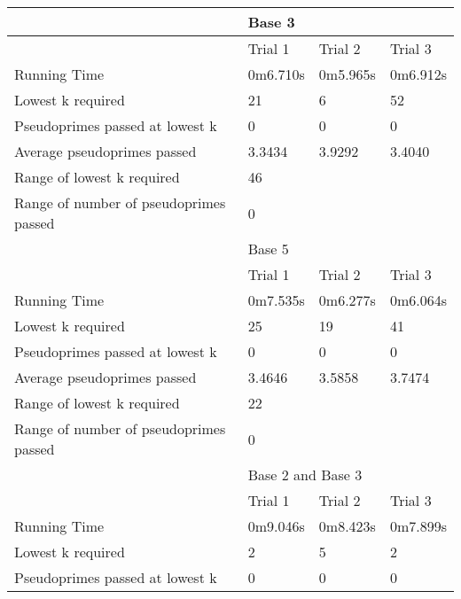 \documentclass{article}
\begin{document}
\begin{appendices}
\begin{longtable}{llll}
\midrule
                                       & \multicolumn{3}{l}{Base 3}             \\
\midrule
                                       & Trial 1   & Trial 2  & Trial 3         \\
Running Time                           & 0m6.710s  & 0m5.965s & 0m6.912s        \\
Lowest k required                      & 21        & 6        & 52              \\
Pseudoprimes passed at lowest k        & 0         & 0        & 0               \\
Average pseudoprimes passed            & 3.3434    & 3.9292   & 3.4040          \\
\cmidrule(lr){2-4}
Range of lowest k required             & \multicolumn{3}{l}{46}                 \\
Range of number of pseudoprimes passed & \multicolumn{3}{l}{0}                  \\
\midrule
                                       & \multicolumn{3}{l}{Base 5}             \\
\midrule
                                       & Trial 1   & Trial 2  & Trial 3         \\
Running Time                           & 0m7.535s  & 0m6.277s & 0m6.064s        \\
Lowest k required                      & 25        & 19       & 41              \\
Pseudoprimes passed at lowest k        & 0         & 0        & 0               \\
Average pseudoprimes passed            & 3.4646    & 3.5858   & 3.7474          \\
\cmidrule(lr){2-4}
Range of lowest k required             & \multicolumn{3}{l}{22}                 \\
Range of number of pseudoprimes passed & \multicolumn{3}{l}{0}                  \\
\midrule
                                       & \multicolumn{3}{l}{Base 2 and Base 3}  \\
\midrule
                                       & Trial 1   & Trial 2  & Trial 3         \\
Running Time                           & 0m9.046s  & 0m8.423s & 0m7.899s        \\
Lowest k required                      & 2         & 5        & 2               \\
Pseudoprimes passed at lowest k        & 0         & 0        & 0               \\

\end{longtable}
\end{appendices}
\end{document}

